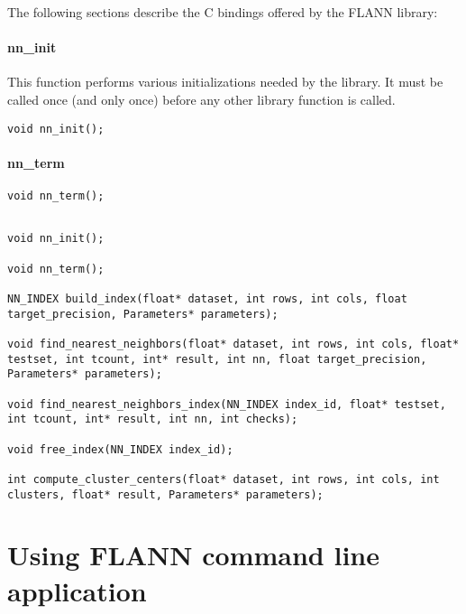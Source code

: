 \documentclass[letter,10pt]{article}
\begin{document}
The following sections describe the C bindings offered by the FLANN library:

\paragraph{nn\_init}
This function performs various initializations needed by the library. It must be called once (and only once) before any other library function is called.
\begin{Verbatim}[fontsize=\footnotesize]
void nn_init();
\end{Verbatim}


\paragraph{nn\_term}
\begin{Verbatim}[fontsize=\footnotesize]
void nn_term();
\end{Verbatim}



\begin{Verbatim}[fontsize=\footnotesize]

void nn_init();

void nn_term();

NN_INDEX build_index(float* dataset, int rows, int cols, float target_precision, Parameters* parameters);

void find_nearest_neighbors(float* dataset, int rows, int cols, float* testset, int tcount, int* result, int nn, float target_precision, Parameters* parameters);

void find_nearest_neighbors_index(NN_INDEX index_id, float* testset, int tcount, int* result, int nn, int checks);

void free_index(NN_INDEX index_id);

int compute_cluster_centers(float* dataset, int rows, int cols, int clusters, float* result, Parameters* parameters);
\end{Verbatim}



\section{Using FLANN command line application}
\end{document}
